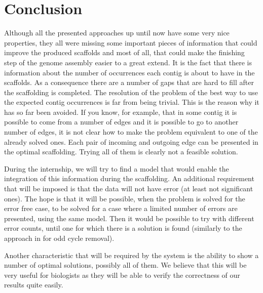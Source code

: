 \documentclass[11pt]{article}
\begin{document}
\section{Conclusion} %
\label{sec:Conclusion}
Although all the presented approaches up until now have some very nice
properties, they all were missing some important pieces of information that
could improve the produced scaffolds and most of all, that could make the
finishing step of the genome assembly easier to a great extend. It is the fact
that there is information about the number of occurrences each contig is about
to have in the scaffolds. As a consequence there are a number of gaps that are
hard to fill after the scaffolding is completed. The resolution of the problem
of the best way to use the expected contig occurrences is far from being
trivial. This is the reason why it has so far been avoided. If you know, for
example, that in some contig it is possible to come from a number of edges and
it is possible to go to another number of edges, it is not clear how to make the
problem equivalent to one of the already solved ones. Each pair of incoming and
outgoing edge can be presented in the optimal scaffolding. Trying all of them is
clearly not a feasible solution.

During the internship, we will try to find a model that would enable the
integration of this information during the scaffolding. An additional
requirement that will be imposed is that the data will not have error (at least
not significant ones). The hope is that it will be possible, when the problem is
solved for the error free case, to be solved for a case where a limited number
of errors are presented, using the same model. Then it would be possible to try
with different error counts, until one for which there is a solution is found
(similarly to the approach in \cite{SCARPA} for odd cycle removal).

Another characteristic that will be required by the system is the ability to
show a number of optimal solutions, possibly all of them. We believe that this
will be very useful for biologists as they will be able to verify the
correctness of our results quite easily.
\end{document}
